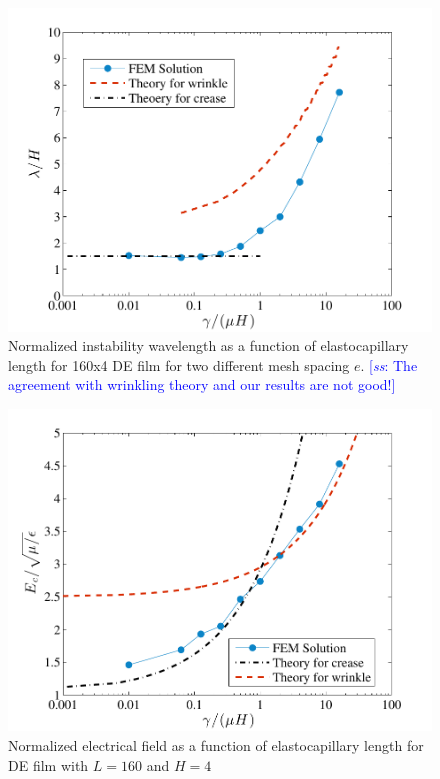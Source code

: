 \documentclass[final,authoryear,3p,times,twocolumn]{elsarticle}
\newcommand{\hsp}[1]{\textcolor{red}{[\textit{hsp}: #1]}}
\newcommand{\sss}[1]{\textcolor{blue}{[\textit{ss}: #1]}}
\begin{document}
\begin{figure} \centering 
\includegraphics[scale=0.8]{pics/wave.pdf}
\caption{Normalized instability wavelength as a function of elastocapillary length for 160x4 DE film for two different mesh spacing $e$.  \sss{The agreement with wrinkling theory and our results are not good!}}
\label{wave} \end{figure}

\begin{figure} \centering 
\includegraphics[scale=0.8]{pics/Ec.pdf}
\caption{Normalized electrical field as a function of elastocapillary length for DE film with $L=160$ and $H=4$}  
\label{wave} \end{figure}
\end{document}
